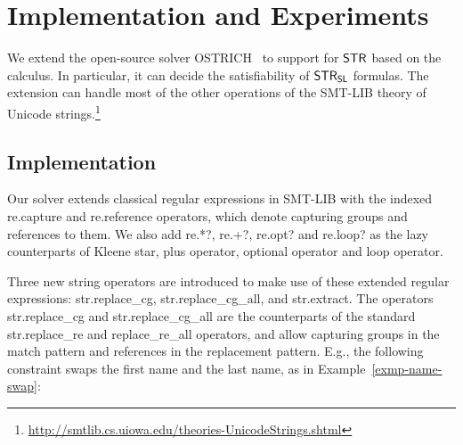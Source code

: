 
\section{Implementation and Experiments}
\label{sect:impl}


We extend the open-source solver
OSTRICH~\cite{CHL+19} to support for $\mathsf{STR}$ %
based on the calculus. In particular, it can decide the satisfiability of
$\mathsf{STR}_{\mathsf{SL}}$ formulas.
The extension can handle most of the
other operations of the SMT-LIB theory of Unicode
strings.\footnote{\url{http://smtlib.cs.uiowa.edu/theories-UnicodeStrings.shtml}}



\subsection{Implementation}

Our solver extends classical regular expressions in SMT-LIB
with the indexed {\sf re.capture} and {\sf re.reference} operators, which
denote capturing groups and references to them. We also add {\sf re.*?}, {\sf re.+?}, {\sf re.opt?} and {\sf re.loop?} as the lazy counterparts of
Kleene star, plus operator, optional operator and loop operator.

Three new string operators are introduced to make use of these extended regular
expressions: {\sf str.replace\_cg}, {\sf str.replace\_cg\_all}, and
{\sf str.extract}. The operators {\sf str.replace\_cg} and {\sf
  str.replace\_cg\_all} are the counterparts of the standard {\sf
  str.replace\_re} and {\sf replace\_re\_all} operators, and allow
capturing groups in the match pattern and references in the
replacement pattern. E.g., the following constraint swaps the
first name and the last name, as in Example~\ref{exmp-name-swap}:

